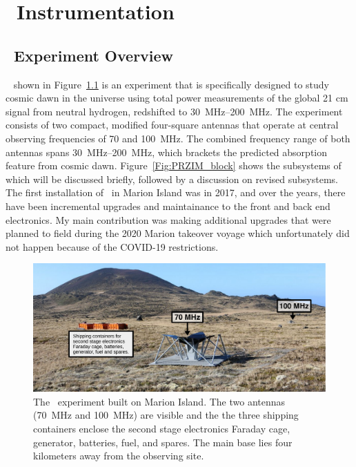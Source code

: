 \chapter{\prizm~Instrumentation}
\section{\prizm~Experiment Overview}

\prizm~\citep[]{2019JAI.....850004P} shown in Figure~\ref{Fig:prizm} is an experiment that is specifically designed to study cosmic dawn in the universe using total power measurements of the global 21 cm signal from neutral hydrogen, redshifted to \SIrange{30}{200}{\mega \hertz}. The experiment consists of two compact, modified four-square antennas \citep{8072391} that operate at central observing frequencies of 70 and 100~MHz. The combined frequency range of both antennas spans \SIrange{30}{200}{\mega \hertz}, which brackets the predicted absorption feature from cosmic dawn. Figure~\ref{Fig:PRZIM_block} shows the subsystems of \prizm\, which will be discussed briefly, followed by a discussion on revised subsystems. The first installation of \prizm\ in Marion Island was in 2017, and over the years, there have been incremental upgrades and maintainance to the front and back end electronics. My main contribution was making additional upgrades that were planned to field during the 2020 Marion takeover voyage which unfortunately did not happen because of the COVID-19 restrictions.

\begin{figure}
	\centering
	\includegraphics[width=\linewidth]{Figures/prizm.pdf}
	\caption{The \prizm\ experiment built on Marion Island. The two antennas (\SI{70}{\mega \hertz} and \SI{100}{\mega \hertz}) are visible and the the three shipping containers enclose the second stage electronics Faraday cage, generator, batteries, fuel, and spares. The main base lies four kilometers away from the observing site.}
	\label{Fig:prizm}
\end{figure}

